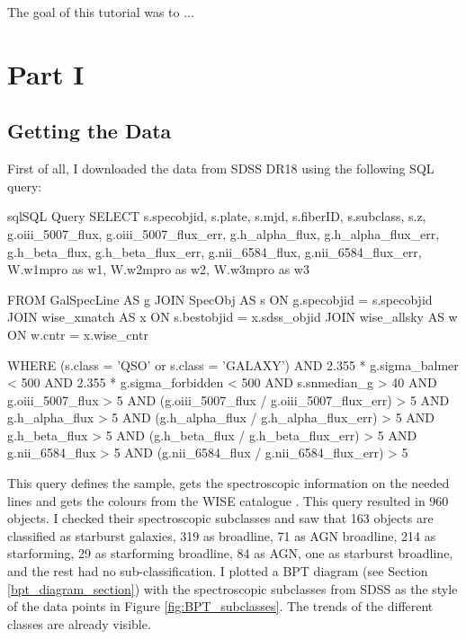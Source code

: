 \documentclass[letterpaper, oneside]{article}
\begin{document}
	
\templatePagecfg


The goal of this tutorial was to ...


\section{Part I}

\subsection{Getting the Data}

First of all, I downloaded the data from SDSS DR18 \cite{sdss_dr18} using the following SQL query:

\begin{sourcecode}[\label{sdss_query}]{sql}{SQL Query}
SELECT s.specobjid, s.plate, s.mjd, s.fiberID, s.subclass, s.z, 
g.oiii_5007_flux, g.oiii_5007_flux_err, 
g.h_alpha_flux, g.h_alpha_flux_err, 
g.h_beta_flux, g.h_beta_flux_err, 
g.nii_6584_flux, g.nii_6584_flux_err, 
W.w1mpro as w1, W.w2mpro as w2, W.w3mpro as w3

FROM GalSpecLine AS g 
JOIN SpecObj AS s ON g.specobjid = s.specobjid
JOIN wise_xmatch AS x ON s.bestobjid = x.sdss_objid
JOIN wise_allsky AS w ON w.cntr = x.wise_cntr

WHERE
(s.class = 'QSO' or s.class = 'GALAXY')
AND 2.355 * g.sigma_balmer < 500
AND 2.355 * g.sigma_forbidden < 500
AND s.snmedian_g > 40
AND g.oiii_5007_flux > 5
AND (g.oiii_5007_flux / g.oiii_5007_flux_err) > 5
AND g.h_alpha_flux > 5
AND (g.h_alpha_flux / g.h_alpha_flux_err) > 5
AND g.h_beta_flux > 5
AND (g.h_beta_flux / g.h_beta_flux_err) > 5
AND g.nii_6584_flux > 5
AND (g.nii_6584_flux / g.nii_6584_flux_err) > 5
\end{sourcecode}

This query defines the sample, gets the spectroscopic information on the needed lines and gets the colours from the WISE catalogue \cite{wise_allsky}. This query resulted in 960 objects. I checked their spectroscopic subclasses and saw that 163 objects are classified as starburst galaxies, 319 as broadline, 71 as AGN broadline, 214 as starforming, 29 as starforming broadline, 84 as AGN, one as starburst broadline, and the rest had no sub-classification. I plotted a BPT diagram (see Section \ref{bpt_diagram_section}) with the spectroscopic subclasses from SDSS as the style of the data points in Figure \ref{fig:BPT_subclasses}. The trends of the different classes are already visible.
\end{document}
